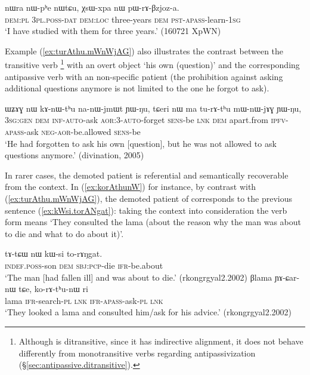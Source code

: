 \begin{exe}
\ex \label{ex:pWrABzjoza}
\gll nɯra nɯ-pʰe nɯtɕu, χsɯ-xpa nɯ pɯ-rɤ-βzjoz-a. \\
\textsc{dem}:\textsc{pl} \textsc{3pl}.\textsc{poss}-\textsc{dat} \textsc{dem}:\textsc{loc} three-years \textsc{dem} \textsc{pst}-\textsc{apass}-learn-\textsc{1sg} \\
\glt `I have studied with them for three years.' (160721 XpWN) 
\end{exe}

Example (\ref{ex:turAthu.mWnWjAG}) also illustrates the contrast between the transitive verb \footnote{Although  is ditransitive, since it has indirective alignment, it does not behave differently from monotransitive verbs regarding antipassivization (§\ref{sec:antipassive.ditransitive}). } with an overt object  `his own (question)' and the corresponding antipassive verb  with an non-specific patient (the prohibition against asking additional questions anymore is not limited to the one he forgot to ask).

\begin{exe}
\ex \label{ex:turAthu.mWnWjAG}
\gll   ɯʑɤɣ nɯ kɤ-nɯ-tʰu na-nɯ-jmɯt ɲɯ-ŋu, tɕeri nɯ ma tu-rɤ-tʰu mɯ-nɯ-jɤɣ ɲɯ-ŋu, \\
\textsc{3sg}:\textsc{gen} \textsc{dem} \textsc{inf}-\textsc{auto}-ask \textsc{aor}:3\flobv{}-\textsc{auto}-forget \textsc{sens}-be \textsc{lnk} \textsc{dem} apart.from \textsc{ipfv}-\textsc{apass}-ask \textsc{neg}-\textsc{aor}-be.allowed \textsc{sens}-be \\
\glt `He had forgotten to ask his own [question], but he was not allowed to ask questions anymore.' (divination, 2005)
\end{exe}


In rarer cases, the demoted patient is referential and semantically recoverable from the context. In (\ref{ex:korAthunW}) for instance, by contrast with (\ref{ex:turAthu.mWnWjAG}), the demoted patient of   corresponds to the previous sentence (\ref{ex:kWsi.torANgat}): taking the context into consideration the verb form  means `They consulted the lama (about the reason why the man was about to die and what to do about it)'.

\begin{exe}
\ex 
\begin{xlist}
\ex \label{ex:kWsi.torANgat} 
\gll tɤ-tɕɯ nɯ kɯ-si to-rɤŋgat. \\
\textsc{indef}.\textsc{poss}-son \textsc{dem} \textsc{sbj}:\textsc{pcp}-die \textsc{ifr}-be.about \\
\glt `The man [had fallen ill] and was about to die.' (rkongrgyal2.2002)
\ex \label{ex:korAthunW} 
\gll  βlama ɲɤ-ɕar-nɯ tɕe, ko-rɤ-tʰu-nɯ ri \\
lama \textsc{ifr}-search-\textsc{pl} \textsc{lnk} \textsc{ifr}-\textsc{apass}-ask-\textsc{pl} \textsc{lnk} \\
\glt `They looked a lama and consulted him/ask for his advice.' (rkongrgyal2.2002)
\end{xlist}
\end{exe}

